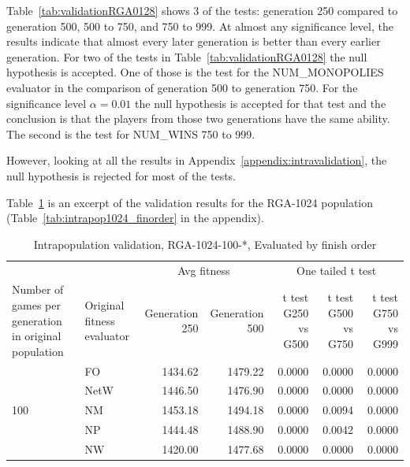 Table~\ref{tab:validationRGA0128} shows 3 of the tests: generation 250 compared
to generation 500, 500 to 750, and 750 to 999. At almost any significance level,
the results indicate that almost every later generation is better than every
earlier generation. For two of the tests in Table~\ref{tab:validationRGA0128}
the null hypothesis is accepted. One of those is the test for the
NUM\_MONOPOLIES evaluator in the comparison of generation 500 to generation 750.
For the significance level \(\alpha=0.01\) the null hypothesis is accepted for
that test and the conclusion is that the players from those two generations have
the same ability. The second is the test for NUM\_WINS 750 to 999.

However, looking at all the results in Appendix~\ref{appendix:intravalidation}, 
the null hypothesis is rejected for most of the tests.

Table~\ref{tab:validationRGA1024} is an excerpt of the validation results
for the RGA-1024 population (Table~\ref{tab:intrapop1024_finorder} in the
appendix).

\begin{table}[ht]
  \centering
  \caption{Intrapopulation validation, RGA-1024-100-*, Evaluated by finish order}
    \begin{tabularx}{\linewidth}{|p{1in}|p{1in}|r|r|r|r|r|}
    \cline{3-7}
    \multicolumn{1}{l}{} &  & \multicolumn{2}{c|}{Avg fitness} & \multicolumn{3}{c|}{One tailed t test} \\
    \cline{1-7}
    Number of games per generation in original population
    & Original fitness evaluator
    & \multicolumn{1}{p{0.7in}|}{Generation 250}
    & \multicolumn{1}{p{0.7in}|}{Generation 500}
    & \multicolumn{1}{X|}{t test G250 vs G500}
    & \multicolumn{1}{X|}{t test G500 vs G750}
    & \multicolumn{1}{X|}{t test G750 vs G999} \\
    \cline{1-7}
      \multirow{5}{*}{100} 
      & FO & 1434.62 & 1479.22 & 0.0000 & 0.0000 & 0.0000 \\
\cline{2-7}             
      & NetW & 1446.50 & 1476.90 & 0.0000 & 0.0000 & 0.0000 \\
\cline{2-7}     
      & NM & 1453.18 & 1494.18 & 0.0000 & 0.0094 & 0.0000 \\
\cline{2-7}    
      & NP & 1444.48 & 1488.90 & 0.0000 & 0.0042 & 0.0000 \\
\cline{2-7}   
      & NW & 1420.00 & 1477.68 & 0.0000 & 0.0000 & 0.0000 \\
      \cline{1-7}
    \end{tabularx}%
  \label{tab:validationRGA1024}%
\end{table}%

